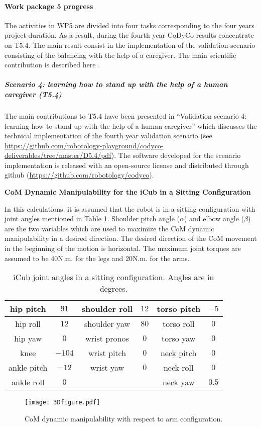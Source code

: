 
\paragraph{Work package 5 progress}

The activities in WP5 are divided into four tasks corresponding to the four years project duration. As a result, during the fourth year CoDyCo results concentrate on T5.4. The main result consist in the implementation of the validation scenario consisting of the balancing with the help of a caregiver. The main scientific contribution is described here \cite{latella2016whole}.

\subparagraph{Scenario 4: learning how to stand up with the help of a human caregiver (T5.4)}

The main contributions to T5.4 have been presented in ``Validation scenario 4: learning how to stand up with the help of a human caregiver'' which discusses the technical implementation of the fourth year validation scenario (see \url{https://github.com/robotology-playground/codyco-deliverables/tree/master/D5.4/pdf}). The software developed for the scenario implementation is released with an open-source license and distributed through github (\url{https://github.com/robotology/codyco}).


\textbf{CoM Dynamic Manipulability for the iCub in a Sitting Configuration}


In this calculations, it is assumed that the robot is in a sitting
configuration with joint angles mentioned in Table \ref{jointangles}.
Shoulder pitch angle ($\alpha$) and elbow angle ($\beta$) are the two
variables which are used to maximize the CoM dynamic manipulability in a
desired direction.  The desired direction of the CoM movement in the beginning
of the motion is horizontal.  The maximum joint torques are assumed to be
$40$N.m. for the legs and $20$N.m. for the arms.
%
\begin{table}[h]
  \centering
  \caption{iCub joint angles in a sitting configuration.  Angles are in
    degrees.}
  \begin{tabular}{|c|c||c|c||c|c|}
    \hline hip pitch   & $91$   & shoulder roll & $12$ & torso pitch & $-5$ \\
    \hline hip roll    & $12$   & shoulder yaw  & $80$ & torso roll  & $0$   \\
    \hline hip yaw     & $0$    & wrist pronos  & $0$  & torso yaw   & $0$   \\
    \hline knee        & $-104$ & wrist pitch   & $0$  & neck pitch  & $0$ \\
    \hline ankle pitch & $-12$  & wrist yaw     & $0$  & neck roll   & $0$ \\
    \hline ankle roll  & $0$    &               &      & neck yaw    & $0.5$ \\
    \hline
  \end{tabular}
  \label{jointangles}
\end{table}
%
\begin{figure}
  \centering
  \texttt{[image: 3Dfigure.pdf]}
  \caption{CoM dynamic manipulability with respect to arm configuration.}
  \label{3Dfig}
\end{figure}
%


